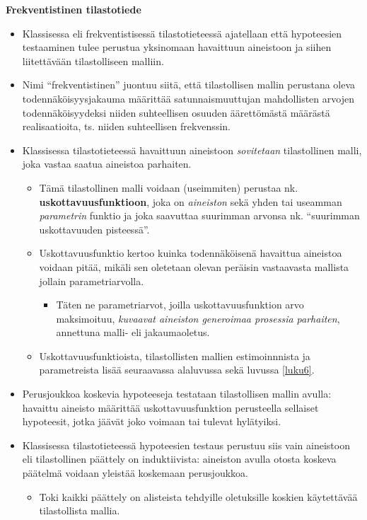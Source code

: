 \documentclass[
]{book}
\providecommand{\tightlist}{%
  \setlength{\itemsep}{0pt}\setlength{\parskip}{0pt}}
\begin{document}
\hfill\break

\textbf{Frekventistinen tilastotiede}

\begin{itemize}
\item
  Klassisessa eli frekventistisessä tilastotieteessä ajatellaan että hypoteesien testaaminen tulee perustua yksinomaan havaittuun aineistoon ja siihen liitettävään tilastolliseen malliin.
\item
  Nimi ``frekventistinen'' juontuu siitä, että tilastollisen mallin perustana oleva todennäköisyysjakauma määrittää satunnaismuuttujan mahdollisten arvojen todennäköisyydeksi niiden suhteellisen osuuden äärettömästä määrästä realisaatioita, ts. niiden suhteellisen frekvenssin.
\item
  Klassisessa tilastotieteessä havaittuun aineistoon \emph{sovitetaan} tilastollinen malli, joka vastaa saatua aineistoa parhaiten.

  \begin{itemize}
  \tightlist
  \item
    Tämä tilastollinen malli voidaan (useimmiten) perustaa nk. \textbf{uskottavuusfunktioon}, joka on \emph{aineiston} sekä yhden tai useamman \emph{parametrin} funktio ja joka saavuttaa suurimman arvonsa nk. ``suurimman uskottavuuden pisteessä''.
  \item
    Uskottavuusfunktio kertoo kuinka todennäköisenä havaittua aineistoa voidaan pitää, mikäli sen oletetaan olevan peräisin vastaavasta mallista jollain parametriarvolla.

    \begin{itemize}
    \tightlist
    \item
      Täten ne parametriarvot, joilla uskottavuusfunktion arvo maksimoituu, \emph{kuvaavat aineiston generoimaa prosessia parhaiten}, annettuna malli- eli jakaumaoletus.
    \end{itemize}
  \item
    Uskottavuusfunktioista, tilastollisten mallien estimoinnnista ja parametreista lisää seuraavassa alaluvussa sekä luvussa \ref{luku6}.
  \end{itemize}
\item
  Perusjoukkoa koskevia hypoteeseja testataan tilastollisen mallin avulla: havaittu aineisto määrittää uskottavuusfunktion perusteella sellaiset hypoteesit, jotka jäävät joko voimaan tai tulevat hylätyiksi.
\item
  Klassisessa tilastotieteessä hypoteesien testaus perustuu siis vain aineistoon eli tilastollinen päättely on induktiivista: aineiston avulla otosta koskeva päätelmä voidaan yleistää koskemaan perusjoukkoa.

  \begin{itemize}
  \tightlist
  \item
    Toki kaikki päättely on alisteista tehdyille oletuksille koskien käytettävää tilastollista mallia.
  \end{itemize}
\end{itemize}
\end{document}
